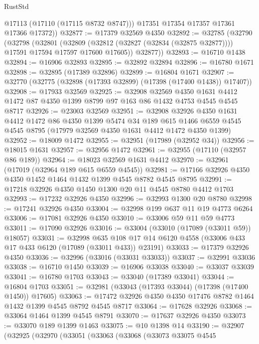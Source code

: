 \begin{lexlean}{RustStd}
\begin{coremodule}
          @17113
          (@17110 (@17115 @8732 @8747)))
        @17351
        @17354
        @17357
        @17361
        @17366
        @17372))
@32877 := @17379 @32569 @4350
@32892 := @32785
    (@32790
      (@32798
        (@32801
          (@32809 (@32812 (@32827 (@32834 (@32875 @32877)))) @17591 @17594 @17597 @17600 @17605))
        @32877))
@32893 := @16710 @1438
@32894 := @16906 @32893
@32895 := @32892 @32894
@32896 := @16780 @1671
@32898 := @32895 (@17389 @32896)
@32899 := @16804 @1671
@32907 := @32770 (@32775 (@32898 (@17393 @32899) (@17398 (@17400 @1438)) @17407))
@32908 := @17933 @32569
@32925 := @32908
    @32569
    @4350
    @1631
    @4412
    @1472
    @87
    @4350
    @1399
    @8799
    @97
    @163
    @86
    @1432
    @4753
    @4545
    @4545
    @8717
@32926 := @23003 @32569
@32951 := @32908
    @32926
    @4350
    @1631
    @4412
    @1472
    @86
    @4350
    @1399
    @5474
    @34
    @189
    @615
    @1466
    @6559
    @4545
    @4545
    @8795
    (@17979 @32569 @4350 @1631 @4412 @1472 @4350 @1399)
@32952 := @18009 @1472
@32955 := @32951 (@17989 (@32952 @34))
@32956 := @18015 @1631
@32957 := @32956 @1472
@32961 := @32955 (@17110 (@32957 @86 @189))
@32964 := @18023 @32569 @1631 @4412
@32970 := @32961 (@17019 (@32964 @189 @615 @6559 @4545))
@32981 := @17166 @32926 @4350 @4350 @1452 @1464 @1432 @1399 @4545 @8782 @4545 @8795
@32991 := @17218 @32926 @4350 @1450 @1300 @20 @11 @4545 @8780 @4412 @1703
@32993 := @17232 @32926 @4350
@32996 := @32993 @1300 @20 @8780
@32998 := @17241 @32926 @4350
@33004 := @32998 @199 @637 @11 @19 @4773 @6264
@33006 := @17081 @32926 @4350
@33010 := @33006 @59 @11 @59 @4773
@33011 := @17090 @32926
@33016 := @33004 (@33010 (@17089 (@33011 @59)) @18057)
@33031 := @32998
    @635
    @108
    @17
    @14
    @6120
    @4558
    (@33006 @433 @17 @433 @6120 (@17089 (@33011 @433)) @23191)
@33033 := @17379 @32926 @4350
@33036 := @32996 (@33016 (@33031 @33033))
@33037 := @32991 @33036
@33038 := @16710 @1450
@33039 := @16906 @33038
@33040 := @33037 @33039
@33041 := @16780 @1703
@33043 := @33040 (@17389 @33041)
@33044 := @16804 @1703
@33051 := @32981 (@33043 (@17393 @33044) (@17398 (@17400 @1450)) @17605)
@33063 := @17472 @32926 @4350 @4350 @17476 @8782 @1464 @1432 @1399 @4545 @8792 @4545 @8717
@33064 := @17628 @32926
@33068 := @33064 @1464 @1399 @4545 @8791
@33070 := @17637 @32926 @4350
@33073 := @33070 @189 @1399 @1463
@33075 := @10 @1398 @14
@33190 := @32907
    (@32925
      (@32970
        (@33051
          (@33063
            (@33068
              (@33073
                @33075
                @4545

\end{coremodule}
\end{lexlean}
